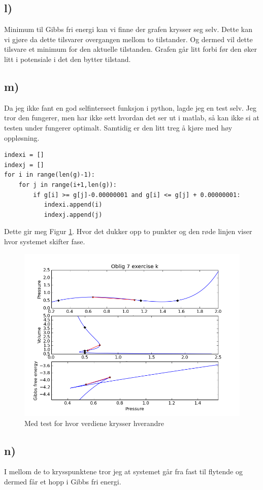 \documentclass[12pt]{article}
\begin{document}
\subsection*{l)}


Minimum til Gibbs fri energi kan vi finne der grafen krysser seg selv. Dette kan vi gjøre da dette tilsvarer overgangen mellom to tilstander. Og dermed vil dette tilsvare et minimum for den aktuelle tilstanden. Grafen går litt forbi før den øker litt i potensiale i det den bytter tilstand. 


\subsection*{m)}

Da jeg ikke fant en god selfintersect funksjon i python, lagde jeg en test selv. Jeg tror den fungerer, men har ikke sett hvordan det ser ut i matlab, så kan ikke si at testen under fungerer optimalt. Samtidig er den litt treg å kjøre med høy oppløsning.  

\begin{lstlisting}
indexi = []
indexj = []
for i in range(len(g)-1): 
    for j in range(i+1,len(g)): 
        if g[i] >= g[j]-0.00000001 and g[i] <= g[j] + 0.00000001: 
           indexi.append(i)
           indexj.append(j)

\end{lstlisting}

Dette gir meg Figur \ref{fig:4}. Hvor det dukker opp to punkter og den røde linjen viser hvor systemet skifter fase.

\begin{figure}
\includegraphics[scale=1]{figure_4.png}
\caption{Med test for hvor verdiene krysser hverandre}
\label{fig:4}
\end{figure}
 
\subsection*{n)}

I mellom de to krysspunktene tror jeg at systemet går fra fast til flytende og dermed får et hopp i Gibbs fri energi. 

 
\end{document}
